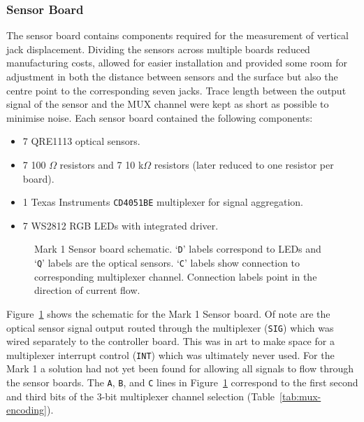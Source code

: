 \subsubsection{Sensor Board}

The sensor board contains components required for the measurement of vertical jack displacement. Dividing the sensors across multiple boards reduced manufacturing costs, allowed for easier installation and provided some room for adjustment in both the distance between sensors and the surface but also the centre point to the corresponding seven jacks. Trace length between the output signal of the sensor and the MUX channel were kept as short as possible to minimise noise. Each sensor board  contained the following components:

\begin{itemize}
    \item 7 QRE1113 optical sensors.
    \item 7 100 $\Omega$ resistors and 7 10 k$\Omega$ resistors (later reduced
    to one resistor per board).
    \item 1 Texas Instruments \texttt{CD4051BE} multiplexer for signal aggregation.
    \item 7 WS2812 RGB LEDs with integrated driver.
\end{itemize}

\begin{figure}
    \centering
                
        \caption{Mark 1 Sensor board schematic. `\texttt{D}' labels correspond to LEDs and `\texttt{Q}' labels are the optical sensors. `\texttt{C}' labels show connection to corresponding multiplexer channel. Connection labels point in the direction of current flow.}
    \label{fig:sensor-schematic-1}
\end{figure}

Figure~\ref{fig:sensor-schematic-1} shows the schematic for the Mark 1 Sensor board.
Of note are the optical sensor signal output routed through the multiplexer (\texttt{SIG}) which was wired separately to the controller board. This was in art to make space for a multiplexer interrupt control (\texttt{INT}) which was ultimately never used. For the Mark 1 a solution had not yet been found for allowing all signals to flow through the sensor boards. The \texttt{A}, \texttt{B}, and \texttt{C} lines in Figure~\ref{fig:sensor-schematic-1} correspond to the first second and third bits of the 3-bit multiplexer channel selection (Table~\ref{tab:mux-encoding}).

